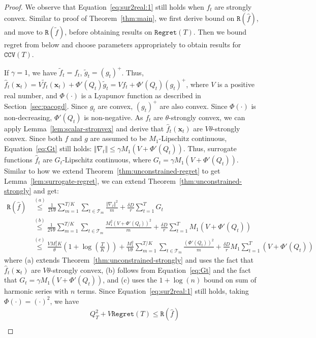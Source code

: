 \documentclass[twoside,11pt,]{article}
\newcommand{\C}[1]{\mathcal{#1}}
\newcommand{\BF}[1]{\mathbf{#1}}
\newcommand{\x}{\BF{x}}
\newcommand{\xt}{\x_t}
\newcommand{\tf}{\tilde{f}}
\newcommand{\tft}{\tilde{f}_t}
\newcommand{\tgt}{\tilde{g}_t}
\newcommand{\hf}{\hat{f}}
\newcommand{\hft}{\hat{f}_t}
\newcommand{\normdt}{\Vert \nabla_t \Vert}
\newcommand{\sumT}{\sum\limits_{t=1}^T}
\newcommand{\qt}{Q_t}
\begin{document}
\begin{proof}
    We observe that Equation~\eqref{eq:sur2real:1} still holds when $f_t$ are strongly convex. Similar to proof of Theorem~\ref{thm:main}, we first derive bound on $\mathtt{R}(\hf)$, and move to $\mathtt{R}(\tf)$, before obtaining results on $\mathtt{Regret}(T)$. Then we bound regret from below and choose parameters appropriately to obtain results for $\mathtt{CCV}(T)$.

    If $\gamma=1$, we have $\tft=f_t$, $\tgt=(g_t)^+$. Thus, $\hft(\xt)=V\tft(\xt)+\Phi'(\qt)\tgt=Vf_t+\Phi'(\qt)(g_t)^+$, where $V$ is a positive real number, and $\Phi(\cdot)$ is a Lyapunov function as described in Section~\ref{sec:pacogd}. 
    Since $g_t$ are convex, $(g_t)^+$ are also convex. 
    Since $\Phi(\cdot)$ is non-decreasing, $\Phi'(\qt)$ is non-negative.
    As $f_t$ are $\theta$-strongly convex, we can apply Lemma~\ref{lem:scalar-stronvex} and derive that $\hft(\xt)$ are $V\theta$-strongly convex.
    Since both $f$ and $g$ are assumed to be $M_1$-Lipschitz continuous, Equation~\eqref{eq:Gt} still holds: $\normdt \leq \gamma M_1(V+\Phi'(\qt))$. Thus, surrogate functions $\hft$ are $G_t$-Lipschitz continuous, where $G_t = \gamma M_1(V+\Phi'(\qt))$.
    Similar to how we extend Theorem~\ref{thm:unconstrained-regret} to get Lemma~\ref{lem:surrogate-regret}, we can extend Theorem~\ref{thm:unconstrained-strongly} and get:
    \begin{align*}
        \mathtt{R}(\hf) & \overset{(a)}\leq \frac{1}{2V\theta}\sum_{m=1}^{T/K}\sum_{t\in\C{T}_m} \frac{\normdt^2}{m} + \frac{\delta D}{r} \sumT G_t\\
        & \overset{(b)} \leq \frac{1}{2V\theta} \sum_{m=1}^{T/K}\sum_{t\in\C{T}_m} \frac{M_1^2(V+\Phi'(\qt))^2}{m} + \frac{\delta D}{r} \sumT M_1(V+\Phi'(\qt))  \\
        & \overset{(c)} \leq \frac{VM_1^2K}{\theta}(1+\log(\frac{T}{K})) 
        +\frac{M_1^2}{V\theta } \sum_{m=1}^{T/K}\sum_{t\in\C{T}_m} \frac{(\Phi'(\qt))^2}{m} + \frac{\delta D}{r} M_1 \sumT (V+\Phi'(\qt))
    \end{align*}
    where (a) extends Theorem~\ref{thm:unconstrained-strongly} and uses the fact that $\hft(\xt)$ are $V\theta$-strongly convex, (b) follows from Equation~\eqref{eq:Gt} and the fact that $G_t = \gamma M_1(V+\Phi'(\qt))$, and (c) uses the $1+\log(n)$ bound on sum of harmonic series with $n$ terms.
    Since Equation~\eqref{eq:sur2real:1} still holds, taking $\Phi(\cdot)=(\cdot)^2$, we have
    \begin{align*}
        & Q_T^2+V\mathtt{Regret}(T) \leq \mathtt{R}(\hf) \\

\end{align*}
\end{proof}
\end{document}
